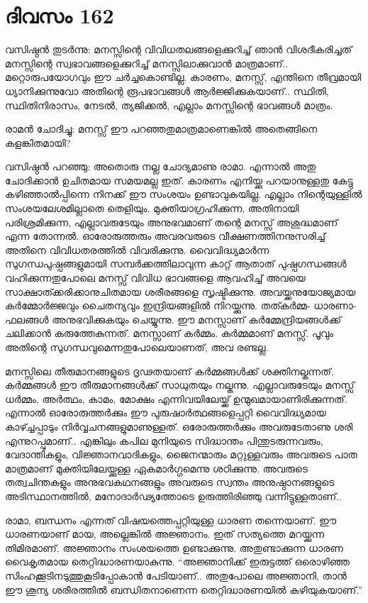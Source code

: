\section{ദിവസം 162}


വസിഷ്ഠൻ തുടർന്നു: മനസ്സിന്റെ വിവിധതലങ്ങളെക്കുറിച്ച് ഞാൻ വിശദീകരിച്ചത് മനസ്സിന്റെ സ്വഭാവങ്ങളെക്കുറിച്ച് മനസ്സിലാക്കുവാൻ മാത്രമാണ്‌..  മറ്റൊരുപയോഗവും ഈ ചർച്ചകൊണ്ടില്ല. കാരണം, മനസ്സ്, എന്തിനെ തീവ്രമായി ധ്യാനിക്കുന്നുവോ അതിന്റെ രൂപഭാവങ്ങൾ ആർജ്ജിക്കുകയാണ്‌..  സ്ഥിതി, സ്ഥിതിനിരാസം, നേടൽ, ത്യജിക്കൽ, എല്ലാം മനസ്സിന്റെ ഭാവങ്ങൾ മാത്രം.

രാമൻ ചോദിച്ചു: മനസ്സ് ഈ പറഞ്ഞതുമാത്രമാണെങ്കിൽ അതെങ്ങിനെ കളങ്കിതമായി?

വസിഷ്ഠൻ പറഞ്ഞു: അതൊരു നല്ല ചോദ്യമാണു രാമാ. എന്നാൽ അതു ചോദിക്കാൻ ഉചിതമായ സമയമല്ല ഇത്. കാരണം എനിയ്ക്കു പറയാനുള്ളതു കേട്ടു കഴിഞ്ഞാല്‍പ്പിന്നെ നിനക്ക് ഈ സംശയം ഉണ്ടാവുകയില്ല. എല്ലാം നിന്റെയുള്ളിൽ സംശയലേശമില്ലാതെ തെളിയും. മുക്തിയാഗ്രഹിക്കുന്ന, അതിനായി പരിശ്രമിക്കുന്ന, എല്ലാവരുടേയും അനുഭവമാണ്‌ തന്റെ മനസ്സ് അശുദ്ധമാണ്‌ എന്ന തോന്നൽ. ഓരോരുത്തരും അവരവരുടെ വീക്ഷണത്തിനനുസരിച്ച് അതിനെ വിവിധതരത്തിൽ വിവരിക്കുന്നു. വൈവിദ്ധ്യമാർന്ന സുഗന്ധപുഷ്പങ്ങളുമായി സമ്പർക്കത്തിലാവുന്ന കാറ്റ് ആതാത് പുഷ്പഗന്ധങ്ങൾ വഹിക്കുന്നതുപോലെ മനസ്സ് വിവിധ ഭാവങ്ങളെ ആവഹിച്ച് അവയെ സാക്ഷാത്ക്കരിക്കാനുചിതമായ ശരീരങ്ങളെ സൃഷ്ടിക്കുന്നു. അവയ്ക്കനുയോജ്യമായ കർമ്മോർജ്ജവും ചൈതന്യവും ഇന്ദ്രിയങ്ങളിൽ നിറയ്ക്കുന്നു. തത്കർമ്മ- ധാരണാ- ഫലങ്ങൾ അനുഭവിക്കുകയും ചെയ്യുന്നു. ഈ മനസ്സാണ്‌ കർമ്മേന്ദ്രിയങ്ങൾക്ക് ചലിക്കാൻ കരുത്തേകുന്നത്. മനസ്സാണ്‌ കർമ്മം. കർമ്മമാണ്‌ മനസ്സ്. പൂവും അതിന്റെ സുഗന്ധവുമെന്നതുപോലെയാണത്, അവ രണ്ടല്ല.

മനസ്സിലെ തീരുമാനങ്ങളുടെ ദൃഢതയാണ്‌ കർമ്മങ്ങൾക്ക്‌ ശക്തിനല്കുന്നത്. കർമ്മങ്ങൾ ഈ തീരുമാനങ്ങൾക്ക് സാധുതയും നല്കുന്നു. എല്ലാവരുടേയും മനസ്സ് ധർമ്മം, അർത്ഥം, കാമം, മോക്ഷം എന്നിവയിലേയ്ക്ക് ഉന്മുഖമായാണിരിക്കുന്നത്. എന്നാൽ ഓരോരുത്തർക്കും ഈ പുരുഷാർത്ഥങ്ങളെപ്പറ്റി വൈവിദ്ധ്യമായ കാഴ്ച്ചപ്പാടും നിർവ്വചനങ്ങളുമാണുള്ളത്. ഒരോരുത്തർക്കും അവരുടേതാണു ശരി എന്നുറപ്പുമാണ്‌.. എങ്കിലും കപില മുനിയുടെ സിദ്ധാന്തം പിന്തുടരുന്നവരും, വേദാന്തികളും, വിജ്ഞാനവാദികളും, ജൈനന്മാരും മറ്റുള്ളവരും അവരുടെ പാത മാത്രമാണ്‌ മുക്തിയിലേയ്ക്കുള്ള ഏകമാർഗ്ഗമെന്നു ശഠിക്കുന്നു. അവരുടെ തത്വചിന്തകളും അനുഭവകഥനങ്ങളും അവരുടെ സ്വന്തം അനുഷ്ഠാനങ്ങളുടെ അടിസ്ഥാനത്തിൽ, മനോദാർഢ്യത്തോടെ ഉരുത്തിരിഞ്ഞു വന്നിട്ടുള്ളതാണ്‌.. 

രാമാ, ബന്ധനം എന്നത് വിഷയത്തെപ്പറ്റിയുള്ള ധാരണ തന്നെയാണ്‌.  ഈ ധാരണയാണ്‌ മായ, അല്ലെങ്കിൽ അജ്ഞാനം. ഇത് സത്യത്തെ മറയ്ക്കുന്ന തിമിരമാണ്‌.  അജ്ഞാനം സംശയത്തെ ഉണ്ടാക്കുന്നു. അതുണ്ടാക്കുന്ന ധാരണ വൈകൃതമായ തെറ്റിദ്ധാരണയാകുന്നു. “അജ്ഞാനിക്ക് ഇരുട്ടത്ത് ഒരൊഴിഞ്ഞ സിംഹക്കൂടിനടുത്തുകൂടിപ്പോകാൻ പേടിയാണ്‌.. അതുപോലെ അജ്ഞാനി, താൻ ഈ ശൂന്യ ശരീരത്തിൽ ബന്ധിതനാണെന്ന തെറ്റിദ്ധാരണയിൽ കഴിയുകയാണ്‌.”

